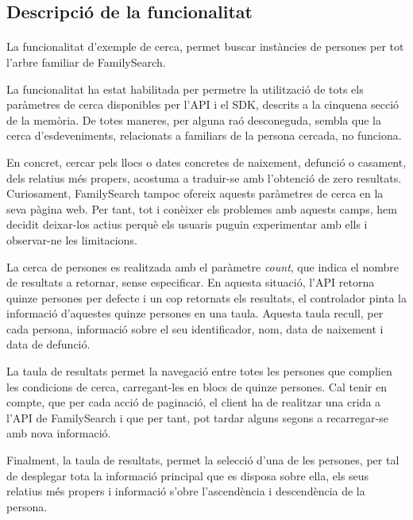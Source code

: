 \subsection{Descripció de la funcionalitat}\label{sec:searchTree}

    \paragraph{}
    La funcionalitat d'exemple de cerca, permet buscar instàncies de persones per tot l'arbre familiar de FamilySearch.

    La funcionalitat ha estat habilitada per permetre la utilització de tots els paràmetres de cerca disponibles per l'API i el SDK, descrits a la cinquena secció de la memòria. De totes maneres, per alguna raó desconeguda, sembla que la cerca d'esdeveniments, relacionats a familiars de la persona cercada, no funciona.

    En concret, cercar pels llocs o dates concretes de naixement, defunció o casament, dels relatius més propers, acostuma a traduir-se amb l'obtenció de zero resultats. Curiosament, FamilySearch tampoc ofereix aquests paràmetres de cerca en la seva pàgina web. Per tant, tot i conèixer els problemes amb aquests camps, hem decidit deixar-los actius perquè els usuaris puguin experimentar amb ells i observar-ne les limitacions.

    La cerca de persones es realitzada amb el paràmetre \emph{count}, que indica el nombre de resultats a retornar, sense especificar. En aquesta situació, l'API retorna quinze persones per defecte i un cop retornats els resultats, el controlador pinta la informació d'aquestes quinze persones en una taula. Aquesta taula recull, per cada persona, informació sobre el seu identificador, nom, data de naixement i data de defunció.

    La taula de resultats permet la navegació entre totes les persones que complien les condicions de cerca, carregant-les en blocs de quinze persones. Cal tenir en compte, que per cada acció de paginació, el client ha de realitzar una crida a l'API de FamilySearch i que per tant, pot tardar alguns segons a recarregar-se amb nova informació.

    Finalment, la taula de resultats, permet la selecció d'una de les persones, per tal de desplegar tota la informació principal que es disposa sobre ella, els seus relatius més propers i informació s'obre l'ascendència i descendència de la persona.
